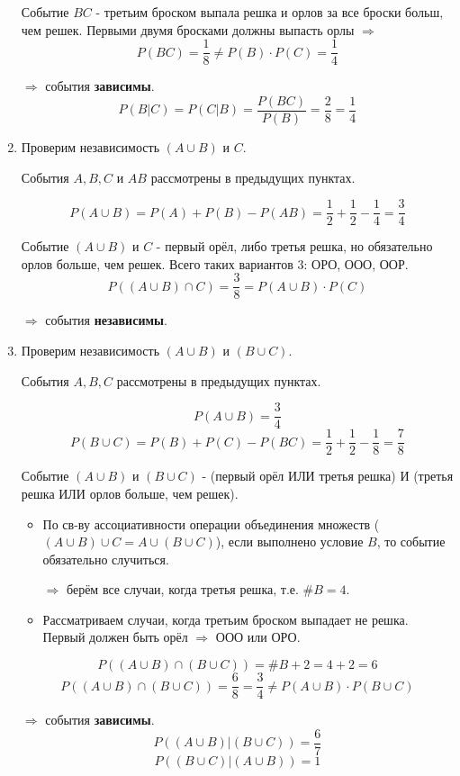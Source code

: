 \begin{enumerate}[label=\alph*)]
	Событие $BC$ - третьим броском выпала решка и орлов за все броски больш, чем решек. Первыми двумя бросками должны выпасть орлы $\Rightarrow$
	\[ P(BC) = \dfrac{1}{8} \ne P(B) \cdot P(C) = \dfrac{1}{4} \]
	
	$\Rightarrow$ события \textbf{зависимы}.
	\[ P(B|C) = P(C|B) = \dfrac{P(BC)}{P(B)} = \dfrac{2}{8} = \dfrac{1}{4} \]
	
	\item Проверим независимость $(A \cup B)$ и $C$.
	
	События $A, B, C$ и $AB$ рассмотрены в предыдущих пунктах.
	
	\[ P(A \cup B) = P(A) + P(B) - P(AB) = \dfrac{1}{2} + \dfrac{1}{2} - \dfrac{1}{4} = \dfrac{3}{4} \]
	
	Событие $(A \cup B)$ и $C$ - первый орёл, либо третья решка, но обязательно орлов больше, чем решек. Всего таких вариантов 3: ОРО, ООО, ООР.
	\[ P\left( (A \cup B) \cap C \right) = \dfrac{3}{8} = P(A \cup B) \cdot P(C) \]
	
	$\Rightarrow$ события \textbf{независимы}.
	
	\item Проверим независимость $(A \cup B)$ и $(B \cup C)$.
	
	События $A, B, C$ рассмотрены в предыдущих пунктах.
	
	\[ P(A \cup B) = \dfrac{3}{4} \]
	\[ P(B \cup C) = P(B) + P(C) - P(BC) = \dfrac{1}{2} + \dfrac{1}{2} - \dfrac{1}{8} = \dfrac{7}{8} \]
	
	Событие $(A \cup B)$ и $(B \cup C)$ - (первый орёл ИЛИ третья решка) И (третья решка ИЛИ орлов больше, чем решек).
	\begin{itemize}
		\item По св-ву ассоциативности операции объединения множеств ($(A \cup B) \cup C = A \cup (B \cup C)$), если выполнено условие $B$, то событие обязательно случиться.
		
		$\Rightarrow$ берём все случаи, когда третья решка, т.е. $\# B = 4$. 
		
		\item Рассматриваем случаи, когда третьим броском выпадает не решка. Первый должен быть орёл $\Rightarrow$ ООО или ОРО.
	\end{itemize}

	\[ P \left( (A \cup B) \cap (B \cup C) \right) = \# B + 2 = 4 + 2 = 6 \]
	\[ P \left( (A \cup B) \cap (B \cup C) \right) = \dfrac{6}{8} = \dfrac{3}{4} \ne P(A \cup B) \cdot P(B \cup C) \]
	
	$\Rightarrow$ события \textbf{зависимы}.
	\[ P \left( (A \cup B) | (B \cup C) \right) = \dfrac{6}{7} \]
	\[ P \left( (B \cup C) | (A \cup B) \right) = 1 \]
	

\end{enumerate}
